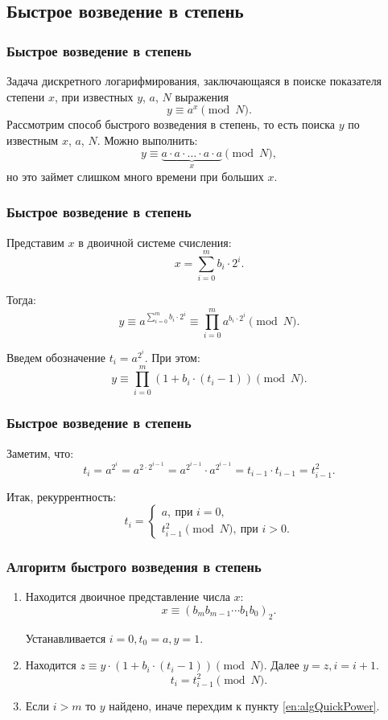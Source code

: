 \subsection{Быстрое возведение в степень}


\begin{frame}
    \frametitle{Быстрое возведение в степень}
    
    Задача дискретного логарифмирования, заключающаяся в поиске показателя степени $x$, при известных $y$, $a$, $N$ выражения 
    \[y\equiv a^x \pmod{N}.\]
    Рассмотрим способ быстрого возведения в степень, то есть поиска $y$ по известным $x$, $a$, $N$. Можно выполнить:
    \[y\equiv\underbrace{a\cdot a\cdot\ldots\cdot a\cdot a}_{x}\pmod{N},\]
    но это займет слишком много времени при больших $x$.
\end{frame}

\begin{frame}
    \frametitle{Быстрое возведение в степень}
    
    Представим $x$ в двоичной системе счисления:
    \[x=\sum_{i=0}^{m}b_i\cdot 2^i.\]

    Тогда:\[y \equiv a^{\sum_{i=0}^{m} b_i\cdot 2^i} \equiv \prod_{i=0}^{m}a^{b_i\cdot 2^i}\pmod{N}.\]
    
    Введем обозначение $t_i=a^{2^i}$. При этом: 
    \[y\equiv\prod_{i=0}^{m}(1+b_i\cdot(t_i-1))\pmod{N}.\]

\end{frame}


\begin{frame}
    \frametitle{Быстрое возведение в степень}
    
    Заметим, что: 
    \[t_i=a^{2^i}=a^{2\cdot 2^{i-1}}=a^{ 2^{i-1}}\cdot a^{2^{i-1}}= t_{i-1}\cdot t_{i-1}=t_{i-1}^2.\]

    Итак, рекуррентность:
    \[
        t_i=
        \begin{cases}
        a,\ \text{при $i=0$},\\
        t_{i-1}^2 \pmod{N},\ \text{при $i>0$}.
        \end{cases}
    \]
\end{frame}


\begin{frame}
    \frametitle{Алгоритм быстрого возведения в степень}
    
    \begin{enumerate}
        \item Находится двоичное представление числа $x$: 
        \[x\equiv(b_mb_{m-1}\cdots b_1b_0)_2.\]

        Устанавливается $i=0, t_0=a, y=1$.
        \item \label{en:algQuickPower}
        Находится $z\equiv y\cdot (1+b_i\cdot(t_i-1))\pmod{N}$. Далее $y=z, i=i+1$.
        \[t_i=t_{i-1}^2\pmod{N}.\]

        \item Если $i>m$ то $y$ найдено, иначе перехдим к пункту \ref{en:algQuickPower}.
    \end{enumerate}
\end{frame}
    


